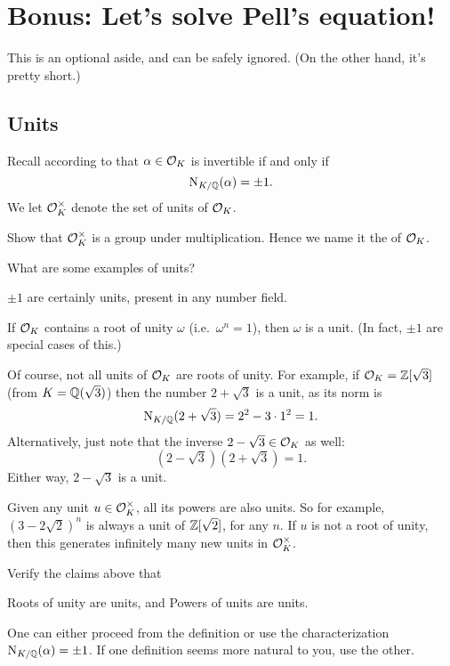 \chapter{Bonus: Let's solve Pell's equation!}
This is an optional aside, and can be safely ignored.
(On the other hand, it's pretty short.)

\section{Units}
Recall according to  that $\alpha \in \mathcal O_K$ is invertible
if and only if \[ \operatorname{N}_{K/\mathbb Q}(\alpha) = \pm 1. \]
We let $\mathcal O_K^\times$ denote the set of units of $\mathcal O_K$.

\begin{ques}
	Show that $\mathcal O_K^\times$ is a group under multiplication.
	Hence we name it the  of $\mathcal O_K$.
\end{ques}

What are some examples of units?
\begin{example}
	\listhack
	\begin{enumerate}
		\ii $\pm 1$ are certainly units, present in any number field.

		\ii If $\mathcal O_K$ contains a root of unity $\omega$ (i.e.\ $\omega^n=1$),
		then $\omega$ is a unit.
		(In fact, $\pm 1$ are special cases of this.)

		\ii Of course, not all units of $\mathcal O_K$ are roots of unity.
		For example, if $\mathcal O_K = \mathbb Z[\sqrt3]$ (from $K = \mathbb Q(\sqrt3)$) then
		the number $2+\sqrt3$ is a unit, as its norm is
		\[ \operatorname{N}_{K/\mathbb Q}(2+\sqrt3) = 2^2 - 3 \cdot 1^2 = 1. \]
		Alternatively, just note that the inverse $2-\sqrt3 \in \mathcal O_K$ as well:
		\[ \left( 2-\sqrt3 \right)\left( 2+\sqrt3 \right) = 1. \]
		Either way, $2-\sqrt3$ is a unit.

		\ii Given any unit $u \in \mathcal O_K^\times$, all its powers are also units.
		So for example, $(3-2\sqrt2)^n$ is always a unit of $\mathbb Z[\sqrt2]$, for any $n$.
		If $u$ is not a root of unity, then this generates infinitely many new units in $\mathcal O_K^\times$.
	\end{enumerate}
\end{example}

\begin{ques}
	Verify the claims above that
	\begin{enumerate}[(a)]
		\ii Roots of unity are units, and
		\ii Powers of units are units.
	\end{enumerate}
	One can either proceed from the definition
	or use the characterization $\operatorname{N}_{K/\mathbb Q}(\alpha) = \pm 1$.
	If one definition seems more natural to you, use the other.
\end{ques}

